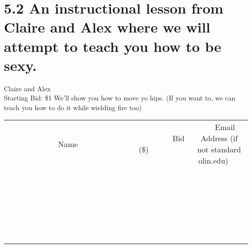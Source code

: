 \documentclass[11pt]{article}
\begin{document}
\section*{5.2 An instructional lesson from Claire and Alex where we will attempt to teach you how to be sexy.}
Claire and Alex
\\
Starting Bid: \$1
\newline
We'll show you how to move yo hips.
(If you want to, we can teach you how to do it while wielding fire too)
\\[6ex]
\begin{tabular}{c c c}
~~~~~~~~~~~~~Name~~~~~~~~~~~~~ & ~~~~~~~~~Bid (\$)~~~~~~~~~  & ~~~Email Address (if not standard olin.edu)~~~\\
 & & \\
\hline
 & & \\
\hline
 & & \\
\hline
 & & \\
\hline
 & & \\
\hline
 & & \\
\hline
 & & \\
\hline
 & & \\
\hline
 & & \\
\hline
 & & \\
\hline
 & & \\
\hline
 & & \\
\hline
 & & \\
\hline
 & & \\
\hline
 & & \\
\hline
 & & \\
\hline
 & & \\
\hline
 & & \\
\hline
 & & \\
\hline
 & & \\
\hline
 & & \\
\hline
 & & \\
\hline
 & & \\
\hline
 & & \\
\hline
 & & \\
\hline
 & & \\
\hline
\end{tabular}
\newpage
\end{document}
